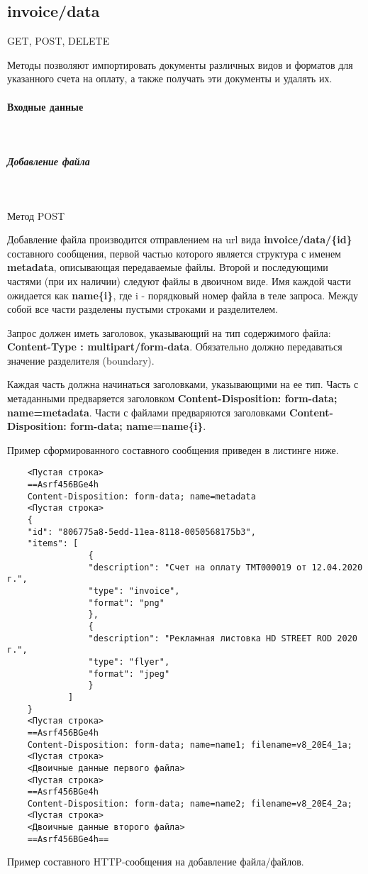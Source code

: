 \documentclass[11pt, a4paper]{article}
\begin{document}
\subsection{invoice/data}
GET, POST, DELETE

Методы позволяют импортировать документы различных видов и форматов для указанного счета на оплату, а также получать эти документы и удалять их.

\paragraph{Входные данные}\

\subparagraph{Добавление файла}\

Метод POST

Добавление файла производится отправлением на url вида \textbf{invoice/data/\{id\}} составного сообщения, первой частью которого является структура с именем \textbf{metadata}, описывающая передаваемые файлы. Второй и последующими частями (при их наличии) следуют файлы в двоичном виде. Имя каждой части ожидается как \textbf{name\{i\}}, где i - порядковый номер файла в теле запроса. Между собой все части разделены пустыми строками и разделителем.

Запрос должен иметь заголовок, указывающий на тип содержимого файла: \textbf{Content-Type : multipart/form-data}. Обязательно должно передаваться значение разделителя (boundary). 

Каждая часть должна начинаться заголовками, указывающими на ее тип. Часть с метаданными предваряется заголовком \textbf{Content-Disposition: form-data; name=metadata}. Части с файлами предваряются заголовками \textbf{Content-Disposition: form-data; name=name\{i\}}.

Пример сформированного составного сообщения приведен в листинге ниже.

\begin{listing}[H]
	\begin{verbatim}
	<Пустая строка>
	==Asrf456BGe4h
	Content-Disposition: form-data; name=metadata
	<Пустая строка>
	{	
	"id": "806775a8-5edd-11ea-8118-0050568175b3",
	"items": [
				{
				"description": "Счет на оплату ТМТ000019 от 12.04.2020 г.",
				"type": "invoice",
				"format": "png"
				},
				{
				"description": "Рекламная листовка HD STREET ROD 2020 г.",
				"type": "flyer",
				"format": "jpeg"
				}
			]
	}	
	<Пустая строка>
	==Asrf456BGe4h
	Content-Disposition: form-data; name=name1; filename=v8_20E4_1a;
	<Пустая строка>
	<Двоичные данные первого файла>
	<Пустая строка>
	==Asrf456BGe4h
	Content-Disposition: form-data; name=name2; filename=v8_20E4_2a;
	<Пустая строка>
	<Двоичные данные второго файла>
	==Asrf456BGe4h==
	\end{verbatim}
	\caption{Пример составного HTTP-сообщения на добавление файла/файлов.}
\end{listing}
\end{document}
